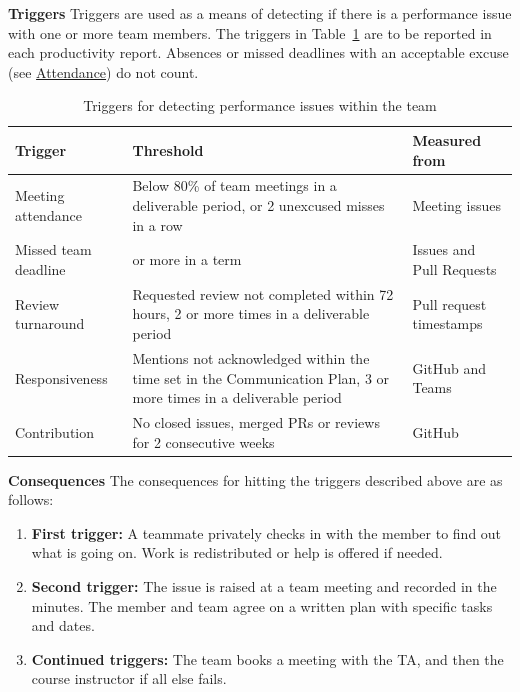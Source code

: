 \documentclass{article}
\begin{document}
\textbf{Triggers} \newline
Triggers are used as a means of detecting if there is a performance issue with one or more team members.
The triggers in Table~\ref{tab:triggers} are to be reported in each productivity report. Absences or missed deadlines with an acceptable excuse (see \hyperref[sec:attendance]{Attendance}) do not count.
\begin{table}[H]
    \centering
    \begin{tabularx}{\textwidth}{>{\raggedright\arraybackslash}p{} >{\raggedright\arraybackslash}X >{\raggedright\arraybackslash}p{}}
\toprule
\textbf{Trigger} & \textbf{Threshold} & \textbf{Measured from}\\
\midrule
Meeting attendance & Below 80\% of team meetings in a deliverable period, or 2 unexcused misses in a row & Meeting issues\\
\addlinespace
Missed team deadline & 2 or more in a term & Issues and Pull Requests\\
\addlinespace
Review turnaround & Requested review not completed within 72 hours, 2 or more times in a deliverable period & Pull request timestamps\\
\addlinespace
Responsiveness & Mentions not acknowledged within the time set in the Communication Plan, 3 or more times in a deliverable period & GitHub and Teams\\
\addlinespace
Contribution & No closed issues, merged PRs or reviews for 2 consecutive weeks & GitHub\\
\bottomrule
    \end{tabularx}
    \caption{Triggers for detecting performance issues within the team}
    \label{tab:triggers}
\end{table}

\textbf{Consequences} \newline
The consequences for hitting the triggers described above are as follows:
\begin{enumerate}
    \item \textbf{First trigger:} A teammate privately checks in with the member to find out what is going on. Work is redistributed or help is offered if needed.
    \item \textbf{Second trigger:} The issue is raised at a team meeting and recorded in the minutes. The member and team agree on a written plan with specific tasks and dates.
    \item \textbf{Continued triggers:} The team books a meeting with the TA, and then the course instructor if all else fails.
\end{enumerate}
\end{document}
